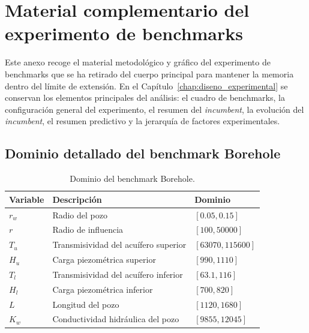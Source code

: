 \chapter{Material complementario del experimento de benchmarks}
\label{app:benchmarks_complementario}

Este anexo recoge el material metodológico y gráfico del experimento de benchmarks que se ha retirado del cuerpo principal para mantener la memoria dentro del límite de extensión. En el Capítulo~\ref{chap:diseno_experimental} se conservan los elementos principales del análisis: el cuadro de benchmarks, la configuración general del experimento, el resumen del \emph{incumbent}, la evolución del \emph{incumbent}, el resumen predictivo y la jerarquía de factores experimentales.

\section{Dominio detallado del benchmark Borehole}
\label{app:dominio_borehole}

\begin{table}[htbp]
\centering
\small
\caption{Dominio del benchmark Borehole.}
\label{tab:app_dominio_borehole}
\renewcommand{\arraystretch}{1.15}
\begin{tabularx}{\textwidth}{@{}p{1.8cm} X p{3.4cm}@{}}
\toprule
\textbf{Variable} & \textbf{Descripción} & \textbf{Dominio} \\
\midrule
\(r_w\)
& Radio del pozo
& \([0.05, 0.15]\) \\

    \(r\) 
    & Radio de influencia 
    & \([100, 50000]\) \\

    \(T_u\) 
    & Transmisividad del acuífero superior 
    & \([63070, 115600]\) \\

    \(H_u\) 
    & Carga piezométrica superior 
    & \([990, 1110]\) \\

    \(T_l\) 
    & Transmisividad del acuífero inferior 
    & \([63.1, 116]\) \\

    \(H_l\) 
    & Carga piezométrica inferior 
    & \([700, 820]\) \\

    \(L\) 
    & Longitud del pozo 
    & \([1120, 1680]\) \\

    \(K_w\) 
    & Conductividad hidráulica del pozo 
    & \([9855, 12045]\) \\
    \bottomrule 
\end{tabularx}

\end{table}
\FloatBarrier
\newpage
